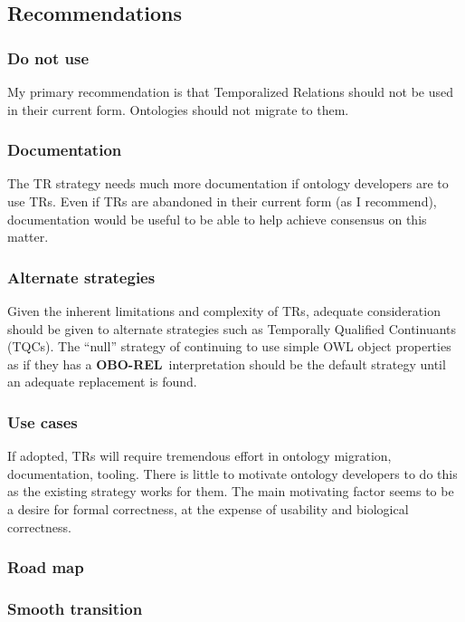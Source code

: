 \documentclass{bioinfo}
\def\OBOREL{\textbf{OBO-REL}}
\begin{document}
\subsection{Recommendations}

\subsubsection{Do not use} My primary recommendation is that
Temporalized Relations should not be used in their current
form. Ontologies should not migrate to them.

\subsubsection{Documentation} The TR strategy needs much more
documentation if ontology developers are to use TRs. Even if TRs are
abandoned in their current form (as I recommend), documentation would
be useful to be able to help achieve consensus on this matter.

\subsubsection{Alternate strategies} Given the inherent limitations
and complexity of TRs, adequate consideration should be given to
alternate strategies such as Temporally Qualified Continuants
(TQCs). The ``null'' strategy of continuing to use simple OWL object
properties as if they has a \OBOREL\ interpretation should be the
default strategy until an adequate replacement is found.

\subsubsection{Use cases} If adopted, TRs will require tremendous
effort in ontology migration, documentation, tooling. There is little
to motivate ontology developers to do this as the existing strategy
works for them. The main motivating factor seems to be a desire for
formal correctness, at the expense of usability and biological
correctness.

\subsubsection{Road map}

\subsubsection{Smooth transition}
\end{document}
